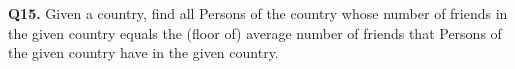 \textbf{Q15.}
Given a country, find all Persons of the country whose number of friends
in the given country equals the (floor of) average number of friends
that Persons of the given country have in the given country.
